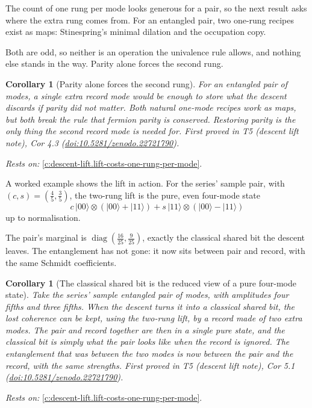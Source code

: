 \documentclass[11pt]{article}
\newtheorem{corollary}[theorem]{Corollary}
\theoremstyle{definition}
\theoremstyle{plain}
\providecommand{\ket}{}\renewcommand{\ket}[1]{|#1\rangle}
\begin{document}
The count of one rung per mode looks generous for a pair, so the next result asks where the extra rung comes from. For an entangled pair, two one-rung recipes exist as maps: Stinespring's minimal dilation and the occupation copy.

Both are odd, so neither is an operation the univalence rule allows, and nothing else stands in the way. Parity alone forces the second rung.

\begin{corollary}[Parity alone forces the second rung]\label{c:descent-lift.parity-alone-forces-second-rung}
For an entangled pair of modes, a single extra record mode would be enough to store what the descent discards if parity did not matter. Both natural one-mode recipes work as maps, but both break the rule that fermion parity is conserved. Restoring parity is the only thing the second record mode is needed for.
\emph{First proved in} T5 (descent lift note), Cor 4.3 (\href{https://doi.org/10.5281/zenodo.22721790}{doi:10.5281/zenodo.22721790}).
\end{corollary}
\noindent\emph{Rests on:} \ref{c:descent-lift.lift-costs-one-rung-per-mode}.

A worked example shows the lift in action. For the series' sample pair, with $(c, s) = (\tfrac45, \tfrac35)$, the two-rung lift is the pure, even four-mode state \[ c\,\ket{00} \otimes (\ket{00} + \ket{11}) + s\,\ket{11} \otimes (\ket{00} - \ket{11}) \] up to normalisation.

The pair's marginal is $\operatorname{diag}(\tfrac{16}{25}, \tfrac{9}{25})$, exactly the classical shared bit the descent leaves. The entanglement has not gone: it now sits between pair and record, with the same Schmidt coefficients.

\begin{corollary}[The classical shared bit is the reduced view of a pure four-mode state]\label{c:descent-lift.classical-shared-bit-reduced-view-pure}
Take the series' sample entangled pair of modes, with amplitudes four fifths and three fifths. When the descent turns it into a classical shared bit, the lost coherence can be kept, using the two-rung lift, by a record made of two extra modes. The pair and record together are then in a single pure state, and the classical bit is simply what the pair looks like when the record is ignored. The entanglement that was between the two modes is now between the pair and the record, with the same strengths.
\emph{First proved in} T5 (descent lift note), Cor 5.1 (\href{https://doi.org/10.5281/zenodo.22721790}{doi:10.5281/zenodo.22721790}).
\end{corollary}
\noindent\emph{Rests on:} \ref{c:descent-lift.lift-costs-one-rung-per-mode}.
\end{document}
